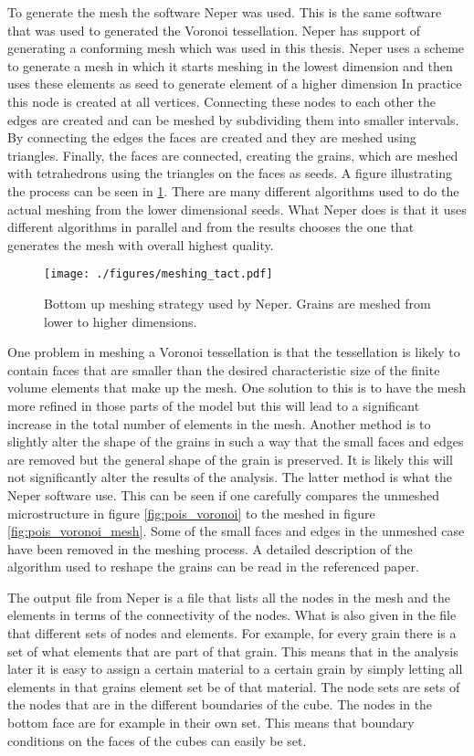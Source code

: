 \documentclass[meshing_micro.tex]{subfiles}
\begin{document}
To generate the mesh the software Neper was used. 
This is the same software that was used to generated the Voronoi tessellation. Neper has support of generating a conforming mesh which was used in this thesis. Neper uses a scheme to generate a mesh in which it starts meshing in the lowest dimension and then uses these elements as seed to generate element of a higher dimension  In practice this  node is created at all vertices. Connecting these nodes to each other the edges are created and can be meshed by subdividing them into smaller intervals. 
By connecting the edges the faces are created and they are meshed using triangles. Finally, the faces are connected, creating the grains, which are meshed with tetrahedrons using the triangles on the faces as seeds. A figure illustrating the process can be seen in \ref{fig:mesh_strat}. There are many different algorithms used to do the actual meshing from the lower dimensional seeds. 
What Neper does is that it uses different algorithms in parallel and from the results chooses the one that generates the mesh with overall highest quality.

 \begin{figure}
\centering
  \texttt{[image: ./figures/meshing\_tact.pdf]}
\caption{Bottom up meshing strategy used by Neper. Grains are meshed from lower to higher dimensions.}
\label{fig:mesh_strat}
\end{figure}


One problem in meshing a Voronoi tessellation is that the tessellation is likely to contain faces that are smaller than the desired characteristic size of the finite volume elements that make up the mesh. One solution to this is to have the mesh more refined in those parts of the model but this will lead to a significant increase in the total number of elements in the mesh.  Another method is to slightly alter the shape of the grains in such a way that the small faces and edges are removed but the general shape of the grain is preserved. It is likely this will not significantly alter the results of the analysis. The latter method is what the Neper software use. This can be seen if one carefully compares the unmeshed microstructure in figure \ref{fig:pois_voronoi} to the meshed in figure \ref{fig:pois_voronoi_mesh}. Some of the small faces and edges in the unmeshed case have been removed in the meshing process. A detailed description of the algorithm used to reshape the grains can be read in the referenced paper.
 
The output file from Neper is a file that lists all the nodes in the mesh and the elements in terms of the connectivity of the nodes. What is also given in the file that different sets of nodes and elements. For example, for every grain there is a set of what elements that are part of that grain. This means that in the analysis later it is easy to assign a certain material to a certain grain by simply letting all elements in that grains element set be of that material. The node sets are sets of the nodes that are in the different boundaries of the cube. The nodes in the bottom face are for example in their own set. This means that boundary conditions on the faces of the cubes can easily be set.
\end{document}

